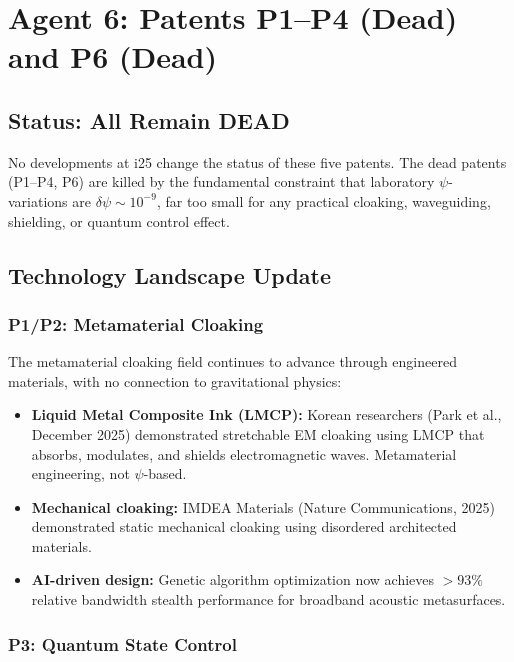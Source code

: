 \documentclass[11pt]{article}
\begin{document}
\section{Agent 6: Patents P1--P4 (Dead) and P6 (Dead)}

\subsection{Status: All Remain DEAD}

No developments at i25 change the status of these five patents.
The dead patents (P1--P4, P6) are killed by the fundamental constraint
that laboratory $\psi$-variations are $\delta\psi \sim 10^{-9}$,
far too small for any practical cloaking, waveguiding, shielding,
or quantum control effect.

\subsection{Technology Landscape Update}

\subsubsection{P1/P2: Metamaterial Cloaking}

The metamaterial cloaking field continues to advance through
engineered materials, with no connection to gravitational physics:

\begin{itemize}
  \item \textbf{Liquid Metal Composite Ink (LMCP):} Korean
    researchers (Park et al., December 2025) demonstrated stretchable
    EM cloaking using LMCP that absorbs, modulates, and shields
    electromagnetic waves. Metamaterial engineering, not $\psi$-based.
  \item \textbf{Mechanical cloaking:} IMDEA Materials (Nature
    Communications, 2025) demonstrated static mechanical cloaking
    using disordered architected materials.
  \item \textbf{AI-driven design:} Genetic algorithm optimization
    now achieves $> 93\%$ relative bandwidth stealth performance
    for broadband acoustic metasurfaces.
\end{itemize}

\subsubsection{P3: Quantum State Control}
\end{document}
